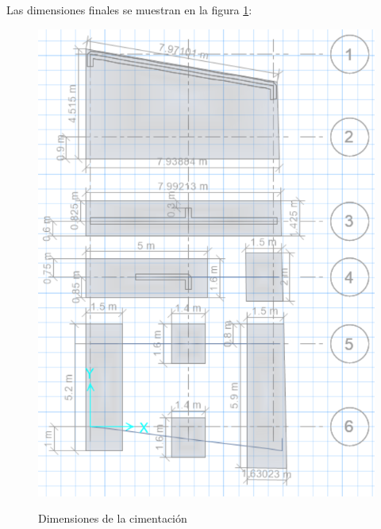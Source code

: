 \documentclass{article}%
\begin{document}
Las dimensiones finales se muestran en la figura \ref{dim}:
\begin{figure}[h!]
    \centering
    \caption{Dimensiones de la cimentación}
    \includegraphics[scale=0.9]{dimensiones.png}
    \label{dim}
\end{figure} 
%
\newpage
\end{document}
